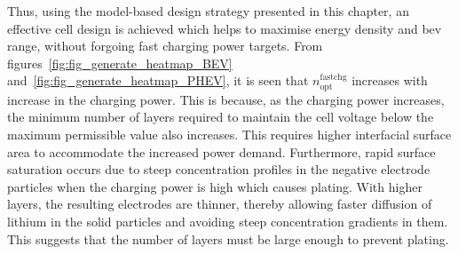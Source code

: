 
Thus,   using    the   model-based    design   strategy   presented    in   this
chapter,   an   effective    cell   design   is   achieved    which   helps   to
maximise   energy   density  and   \gls{bev}   range,   without  forgoing   fast
charging   power    targets.   From   figures~\ref{fig:fig_generate_heatmap_BEV}
and~\ref{fig:fig_generate_heatmap_PHEV},       it       is       seen       that
$n^\text{fastchg}_\text{opt}$  increases with  increase in  the charging  power.
This is because,  as the charging power increases, the  minimum number of layers
required to maintain  the cell voltage below the maximum  permissible value also
increases.  This requires  higher interfacial  surface area  to accommodate  the
increased  power demand.  Furthermore, rapid  surface saturation  occurs due  to
steep  concentration  profiles in  the  negative  electrode particles  when  the
charging power is  high which causes plating. With higher  layers, the resulting
electrodes  are thinner,  thereby allowing  faster diffusion  of lithium  in the
solid  particles  and  avoiding  steep concentration  gradients  in  them.  This
suggests that the number of layers must be large enough to prevent plating.

